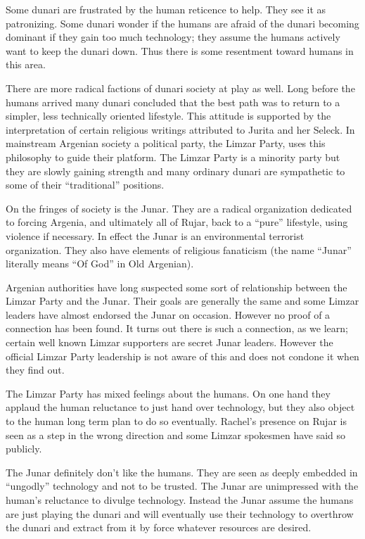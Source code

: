 Some dunari are frustrated by the human reticence to help. They see it as patronizing. Some
dunari wonder if the humans are afraid of the dunari becoming dominant if they gain too much
technology; they assume the humans actively want to keep the dunari down. Thus there is some
resentment toward humans in this area.

There are more radical factions of dunari society at play as well. Long before the humans
arrived many dunari concluded that the best path was to return to a simpler, less technically
oriented lifestyle. This attitude is supported by the interpretation of certain religious
writings attributed to Jurita and her Seleck. In mainstream Argenian society a political party,
the Limzar Party, uses this philosophy to guide their platform. The Limzar Party is a minority
party but they are slowly gaining strength and many ordinary dunari are sympathetic to some of
their ``traditional'' positions.

On the fringes of society is the Junar. They are a radical organization dedicated to forcing
Argenia, and ultimately all of Rujar, back to a ``pure'' lifestyle, using violence if
necessary. In effect the Junar is an environmental terrorist organization. They also have
elements of religious fanaticism (the name ``Junar'' literally means ``Of God'' in Old
Argenian).

Argenian authorities have long suspected some sort of relationship between the Limzar Party and
the Junar. Their goals are generally the same and some Limzar leaders have almost endorsed the
Junar on occasion. However no proof of a connection has been found. It turns out there is such a
connection, as we learn; certain well known Limzar supporters are secret Junar leaders. However
the official Limzar Party leadership is not aware of this and does not condone it when they find
out.

The Limzar Party has mixed feelings about the humans. On one hand they applaud the human
reluctance to just hand over technology, but they also object to the human long term plan to do
so eventually. Rachel's presence on Rujar is seen as a step in the wrong direction and some
Limzar spokesmen have said so publicly.

The Junar definitely don't like the humans. They are seen as deeply embedded in ``ungodly''
technology and not to be trusted. The Junar are unimpressed with the human's reluctance to
divulge technology. Instead the Junar assume the humans are just playing the dunari and will
eventually use their technology to overthrow the dunari and extract from it by force whatever
resources are desired.

